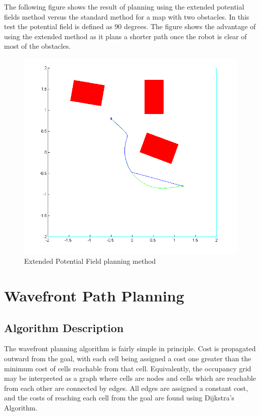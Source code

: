 \documentclass[11pt]{article} %
\begin{document}
The following figure shows the result of planning using the extended potential fields method versus the standard method for a map with two obstacles. In this test the potential field is defined as 90 degrees. The figure shows the advantage of using the extended method as it plans a shorter path once the robot is clear of most of the obstacles.

\begin{figure}[hbt]
 \centering
 \includegraphics[scale=0.60]{ExtPotField.png}
 \caption{Extended Potential Field planning method}
 \label{potField_Surf}
\end{figure}
\clearpage
\section{Wavefront Path Planning}

\subsection{Algorithm Description}
The wavefront planning algorithm is fairly simple in principle.  Cost is propagated outward from the goal, with each cell being assigned a cost one greater than the minimum cost of cells reachable from that cell.  Equivalently, the occupancy grid may be interpreted as a graph where cells are nodes and cells which are reachable from each other are connected by edges.  All edges are assigned a constant cost, and the costs of reaching each cell from the goal are found using Dijkstra's Algorithm.
\end{document}
